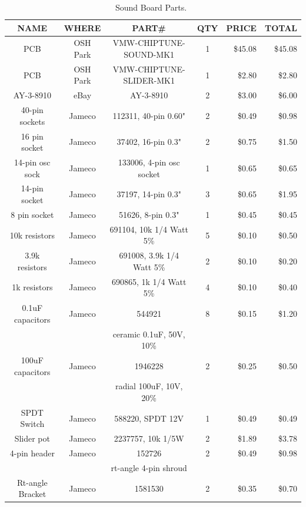 \documentclass[11pt]{article}
\begin{document}
\begin{table}
\caption{Sound Board Parts.~\label{table:sound_parts}}
\centering
\begin{tabular}{|c|c|c|c|r|r|}
\hline
NAME		& WHERE		& PART\#                  & QTY	& PRICE	   & TOTAL \\
\hline
\hline
PCB		& OSH Park	& VMW-CHIPTUNE-SOUND-MK1  & 1	& \$45.08  & \$45.08 \\
\hline
PCB		& OSH Park	& VMW-CHIPTUNE-SLIDER-MK1 & 1   &  \$2.80  &  \$2.80 \\
\hline
AY-3-8910	& eBay		& AY-3-8910		  & 2	&  \$3.00  &  \$6.00 \\
\hline
40-pin sockets	& Jameco	& 112311, 40-pin 0.60"    & 2	&  \$0.49  &  \$0.98 \\
\hline
16 pin socket	& Jameco	& 37402, 16-pin 0.3"      & 2	&  \$0.75  &  \$1.50 \\
\hline
14-pin osc sock	& Jameco	& 133006, 4-pin osc socket& 1	&  \$0.65  &  \$0.65 \\
\hline
14-pin socket	& Jameco	& 37197, 14-pin 0.3"      & 3	&  \$0.65  &  \$1.95 \\
\hline
8 pin socket	& Jameco	& 51626, 8-pin 0.3"       & 1	&  \$0.45  &  \$0.45 \\
\hline
10k resistors	& Jameco	& 691104, 10k 1/4 Watt 5\%& 5   &  \$0.10  &  \$0.50 \\
\hline
3.9k resistors	& Jameco	& 691008, 3.9k 1/4 Watt 5\%& 2   &  \$0.10  &  \$0.20 \\
\hline
1k resistors	& Jameco	& 690865, 1k 1/4 Watt 5\% & 4   &  \$0.10  &  \$0.40 \\
\hline
0.1uF capacitors& Jameco	& 544921		  & 8   &  \$0.15  &  \$1.20 \\
		&		& ceramic 0.1uF, 50V, 10\%&     &          &         \\
\hline
100uF capacitors& Jameco	& 1946228		  & 2   &  \$0.25  &  \$0.50 \\
		&		& radial 100uF, 10V, 20\% &     &          &         \\
\hline
SPDT Switch	& Jameco	& 588220, SPDT 12V	  & 1	&  \$0.49  &  \$0.49 \\
\hline
Slider pot	& Jameco	& 2237757, 10k 1/5W	  & 2	&  \$1.89  &  \$3.78 \\
\hline
4-pin header	& Jameco	& 152726		  & 2	&  \$0.49  &  \$0.98 \\
		&		& rt-angle 4-pin shroud	  &	&          &         \\
\hline
Rt-angle Bracket& Jameco	& 1581530		  & 2	&  \$0.35  &  \$0.70 \\

\end{tabular}
\end{table}
\end{document}
